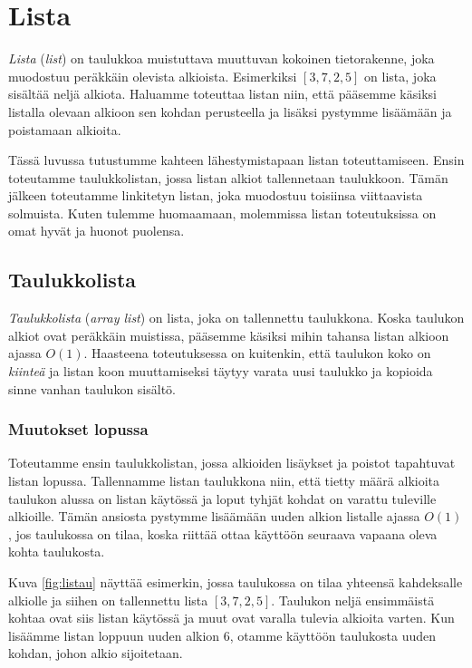 \chapter{Lista}


\emph{Lista} (\emph{list}) on taulukkoa muistuttava muuttuvan kokoinen tietorakenne,
joka muodostuu peräkkäin olevista alkioista.
Esimerkiksi $[3,7,2,5]$ on lista, joka sisältää neljä alkiota.
Haluamme toteuttaa listan niin,
että pääsemme käsiksi listalla olevaan alkioon
sen kohdan perusteella
ja lisäksi pystymme lisäämään ja poistamaan alkioita.

Tässä luvussa tutustumme kahteen lähestymistapaan listan toteuttamiseen.
Ensin toteutamme taulukkolistan,
jossa listan alkiot tallennetaan taulukkoon.
Tämän jälkeen toteutamme linkitetyn listan,
joka muodostuu toisiinsa viittaavista solmuista.
Kuten tulemme huomaamaan, molemmissa listan toteutuksissa on omat
hyvät ja huonot puolensa.

\section{Taulukkolista}


\emph{Taulukkolista} (\emph{array list}) on lista, joka on tallennettu taulukkona.
Koska taulukon alkiot ovat peräkkäin muistissa,
pääsemme käsiksi mihin tahansa listan alkioon ajassa $O(1)$.
Haasteena toteutuksessa on kuitenkin,
että taulukon koko on \emph{kiinteä} ja
listan koon muuttamiseksi täytyy varata uusi taulukko
ja kopioida sinne vanhan taulukon sisältö.

\subsection{Muutokset lopussa}

Toteutamme ensin taulukkolistan, jossa alkioiden
lisäykset ja poistot tapahtuvat listan lopussa.
Tallennamme listan taulukkona niin,
että tietty määrä alkioita taulukon alussa on listan käytössä
ja loput tyhjät kohdat on varattu tuleville alkioille.
Tämän ansiosta pystymme lisäämään uuden alkion listalle
ajassa $O(1)$, jos taulukossa on tilaa,
koska riittää ottaa käyttöön seuraava
vapaana oleva kohta taulukosta.

Kuva \ref{fig:listau} näyttää esimerkin,
jossa taulukossa on tilaa yhteensä kahdeksalle alkiolle
ja siihen on tallennettu lista $[3,7,2,5]$.
Taulukon neljä ensimmäistä kohtaa ovat siis listan käytössä
ja muut ovat varalla tulevia alkioita varten.
Kun lisäämme listan loppuun uuden alkion 6,
otamme käyttöön taulukosta uuden kohdan, johon alkio sijoitetaan.

